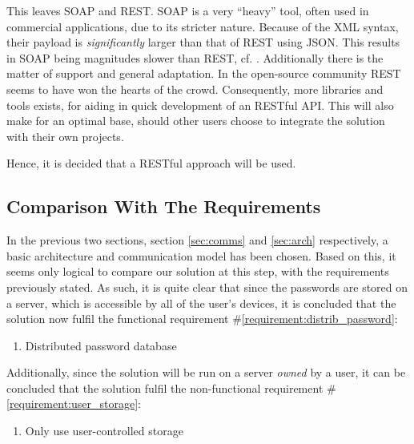 			This leaves SOAP and REST. SOAP is a very ``heavy'' tool, often used in commercial applications, due to its stricter nature. Because of the XML syntax, their payload is \emph{significantly} larger than that of REST using JSON. This results in SOAP being magnitudes slower than REST, cf. \cite{soap_vs_rest}. Additionally there is the matter of support and general adaptation. In the open-source community REST seems to have won the hearts of the crowd. Consequently, more libraries and tools exists, for aiding in quick development of an RESTful API. This will also make for an optimal base, should other users choose to integrate the solution with their own projects.




			Hence, it is decided that a RESTful approach will be used. 

		\subsection{Comparison With The Requirements}
			\label{requirement:fulfilled:distrib_password}
			\label{requirement:fulfilled:user_storage}

			In the previous two sections, section \ref{sec:comms} and \ref{sec:arch} respectively, a basic architecture and communication model has been chosen. Based on this, it seems only logical to compare our solution at this step, with the requirements previously stated. As such, it is quite clear that since the passwords are stored on a server, which is accessible by all of the user's devices, it is concluded that the solution now fulfil the functional requirement \#\ref{requirement:distrib_password}:

			\vspace{-3ex}\begin{enumerate}
				\setlength\itemsep{0.1em}
				\item Distributed password database
			\end{enumerate}

			Additionally, since the solution will be run on a server \emph{owned} by a user, it can be concluded that the solution fulfil the non-functional requirement \#\ref{requirement:user_storage}:
			\vspace{-3ex}\begin{enumerate}
				\setlength\itemsep{0.1em}
				\item Only use user-controlled storage
			\end{enumerate}

